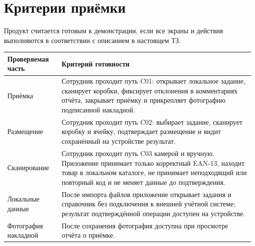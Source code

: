 \section{Критерии приёмки}

Продукт считается готовым к демонстрации, если все экраны и действия выполняются в соответствии с описанием в настоящем ТЗ.

\begin{tabularx}{\textwidth}{L{48mm}Y}
\toprule
\textbf{Проверяемая часть} & \textbf{Критерий готовности} \\
\midrule
Приёмка & Сотрудник проходит путь C01: открывает локальное задание, сканирует коробки, фиксирует отклонения в комментариях отчёта, закрывает приёмку и прикрепляет фотографию подписанной накладной. \\
Размещение & Сотрудник проходит путь C02: выбирает задание, сканирует коробку и ячейку, подтверждает размещение и видит сохранённый на устройстве результат. \\
Сканирование & Сотрудник проходит путь C03 камерой и вручную. Приложение принимает только корректный EAN-13, находит товар в локальном каталоге, не принимает неподходящий или повторный код и не меняет данные до подтверждения. \\
Локальные данные & После импорта файлов приложение открывает задания и справочник без подключения к внешней учётной системе; результат подтверждённой операции доступен на устройстве. \\
Фотография накладной & После сохранения фотография доступна при просмотре отчёта о приёмке. \\
\bottomrule
\end{tabularx}
